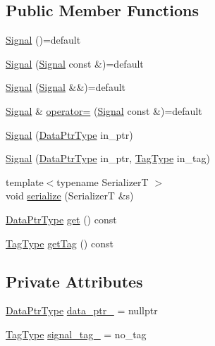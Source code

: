\subsection*{Public Member Functions}
\begin{DoxyCompactItemize}
\item 
\hyperlink{structvt_1_1pipe_1_1signal_1_1_signal_a019363b72392fcf448dc72194f66166f}{Signal} ()=default
\item 
\hyperlink{structvt_1_1pipe_1_1signal_1_1_signal_a5fba0db3ce0cb3e202ab3c5b7e3e2afa}{Signal} (\hyperlink{structvt_1_1pipe_1_1signal_1_1_signal}{Signal} const \&)=default
\item 
\hyperlink{structvt_1_1pipe_1_1signal_1_1_signal_aae63474ae7444649579948a543d5281a}{Signal} (\hyperlink{structvt_1_1pipe_1_1signal_1_1_signal}{Signal} \&\&)=default
\item 
\hyperlink{structvt_1_1pipe_1_1signal_1_1_signal}{Signal} \& \hyperlink{structvt_1_1pipe_1_1signal_1_1_signal_a31c544fb4732587116decd8adddc6fa3}{operator=} (\hyperlink{structvt_1_1pipe_1_1signal_1_1_signal}{Signal} const \&)=default
\item 
\hyperlink{structvt_1_1pipe_1_1signal_1_1_signal_ac0daf7c39233e5fe853ff3a4ec8f1d57}{Signal} (\hyperlink{structvt_1_1pipe_1_1signal_1_1_signal_a9c8166338314e5d595575c21eaa42859}{Data\+Ptr\+Type} in\+\_\+ptr)
\item 
\hyperlink{structvt_1_1pipe_1_1signal_1_1_signal_a6fd49ac7971cb93dd3caf0d079c30fed}{Signal} (\hyperlink{structvt_1_1pipe_1_1signal_1_1_signal_a9c8166338314e5d595575c21eaa42859}{Data\+Ptr\+Type} in\+\_\+ptr, \hyperlink{namespacevt_a84ab281dae04a52a4b243d6bf62d0e52}{Tag\+Type} in\+\_\+tag)
\item 
{\footnotesize template$<$typename SerializerT $>$ }\\void \hyperlink{structvt_1_1pipe_1_1signal_1_1_signal_a6b39c1352116ba4464740c62d340fffa}{serialize} (SerializerT \&s)
\item 
\hyperlink{structvt_1_1pipe_1_1signal_1_1_signal_a9c8166338314e5d595575c21eaa42859}{Data\+Ptr\+Type} \hyperlink{structvt_1_1pipe_1_1signal_1_1_signal_a0d6606179504be4e4c02d0ea80aec823}{get} () const
\item 
\hyperlink{namespacevt_a84ab281dae04a52a4b243d6bf62d0e52}{Tag\+Type} \hyperlink{structvt_1_1pipe_1_1signal_1_1_signal_a0d55d4712aadfc8cc848e8bd45814351}{get\+Tag} () const
\end{DoxyCompactItemize}
\subsection*{Private Attributes}
\begin{DoxyCompactItemize}
\item 
\hyperlink{structvt_1_1pipe_1_1signal_1_1_signal_a9c8166338314e5d595575c21eaa42859}{Data\+Ptr\+Type} \hyperlink{structvt_1_1pipe_1_1signal_1_1_signal_ad868339a532c909881ae4c096dc8e3cd}{data\+\_\+ptr\+\_\+} = nullptr
\item 
\hyperlink{namespacevt_a84ab281dae04a52a4b243d6bf62d0e52}{Tag\+Type} \hyperlink{structvt_1_1pipe_1_1signal_1_1_signal_ad970018d2b59a343ea9b9253d2b45858}{signal\+\_\+tag\+\_\+} = no\+\_\+tag
\end{DoxyCompactItemize}


